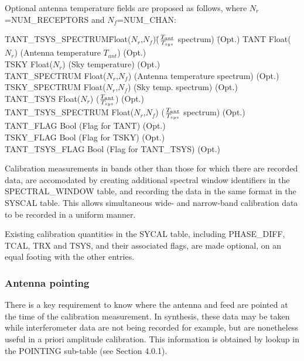 \documentclass{article}
\newcommand{\nr}{$N_r$}
\newcommand{\nf}{$N_f$}
\begin{document}
Optional antenna temperature fields are proposed as follows, where
\nr=NUM\_RECEPTORS and \nf=NUM\_CHAN:

\begin{tabbing}
TANT\_TSYS\_SPECTRUM\quad\quad \= Float(\nr,\nf)\quad\quad \=
(${{T_{ant}}\over{T_{sys}}}$ spectrum)
\quad\quad\quad\quad\quad\quad\quad\quad\quad 
\= (Opt.) \kill
TANT \> Float(\nr) \> (Antenna temperature $T_{ant}$) \> (Opt.) \\
TSKY \> Float(\nr) \> (Sky temperature) \> (Opt.) \\
TANT\_SPECTRUM   \> Float(\nr,\nf)  \> 
(Antenna temperature spectrum) \> (Opt.) \\
TSKY\_SPECTRUM \> Float(\nr,\nf) \> (Sky temp. spectrum) \> (Opt.) \\
TANT\_TSYS     \> Float(\nr) \>
(${{T_{ant}}\over{T_{sys}}}$) \> (Opt.) \\
TANT\_TSYS\_SPECTRUM     \> Float(\nr,\nf) \>
(${{T_{ant}}\over{T_{sys}}}$ spectrum) \> (Opt.) \\
TANT\_FLAG     \> Bool \>
(Flag for TANT) \> (Opt.) \\
TSKY\_FLAG \> Bool \> (Flag for TSKY) \> (Opt.) \\
TANT\_TSYS\_FLAG     \> Bool \>
(Flag for TANT\_TSYS) \> (Opt.) \\
\end{tabbing}

 Calibration measurements in bands other than those for which there
are recorded data, are accomodated by creating additional spectral
window identifiers in the SPECTRAL\_WINDOW table, and recording the
data in the same format in the SYSCAL table. This allows simultaneous
wide- and narrow-band calibration data to be recorded in a uniform manner.

 Existing calibration quantities in the SYCAL table, including
PHASE\_DIFF, TCAL, TRX and TSYS, and their associated flags, are made
optional, on an equal footing with the other entries.


\subsubsection{Antenna pointing}

There is a key requirement to know where the antenna and feed are
pointed at the time of the calibration measurement. In synthesis,
these data may be taken while interferometer data are not being
recorded for example, but are nonetheless useful in a priori amplitude
calibration. This information is obtained by lookup in the POINTING
sub-table (see Section 4.0.1).
\end{document}
